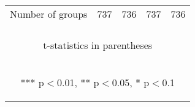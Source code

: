 \documentclass[border=0.2cm]{standalone}
\begin{document}
\begin{tabular}{lcccc}
    Number of groups       & 737                                            & 736                                            & 737                                             & 736                                            \\
    \vspace{2pt}           & \begin{footnotesize}\end{footnotesize}         & \begin{footnotesize}\end{footnotesize}         & \begin{footnotesize}\end{footnotesize}          & \begin{footnotesize}\end{footnotesize}         \\
    \bottomrule
    \multicolumn{5}{c}{\begin{footnotesize} t-statistics in parentheses\end{footnotesize}}                                                                                                                                      \\
    \multicolumn{5}{c}{\begin{footnotesize} *** p$<$0.01, ** p$<$0.05, * p$<$0.1\end{footnotesize}}                                                                                                                             \\
\end{tabular}
\end{document}
